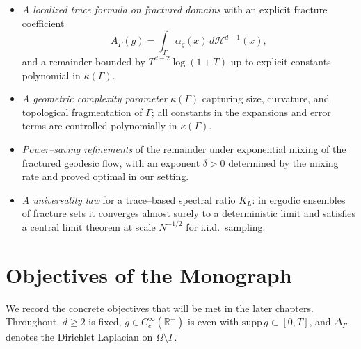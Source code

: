 \begin{itemize}
  \item \emph{A localized trace formula on fractured domains} with an explicit 
  fracture coefficient 
  \[
  A_\Gamma(g)=\int_\Gamma \alpha_g(x)\,d\mathcal H^{d-1}(x),
  \]
  and a remainder bounded by $T^{d-2}\log(1+T)$ up to explicit constants 
  polynomial in $\kappa(\Gamma)$.

  \item \emph{A geometric complexity parameter} $\kappa(\Gamma)$ capturing size, 
  curvature, and topological fragmentation of $\Gamma$; all constants in the 
  expansions and error terms are controlled polynomially in $\kappa(\Gamma)$.

  \item \emph{Power–saving refinements} of the remainder under exponential 
  mixing of the fractured geodesic flow, with an exponent $\delta>0$ determined 
  by the mixing rate and proved optimal in our setting.

  \item \emph{A universality law} for a trace–based spectral ratio $K_L$: in 
  ergodic ensembles of fracture sets it converges almost surely to a 
  deterministic limit and satisfies a central limit theorem at scale $N^{-1/2}$ 
  for i.i.d.\ sampling.
\end{itemize}

\section{Objectives of the Monograph}

We record the concrete objectives that will be met in the later chapters. 
Throughout, $d\ge2$ is fixed, $g\in C_c^\infty(\mathbb R^+)$ is even with 
$\mathrm{supp}\,g\subset[0,T]$, and $\Delta_\Gamma$ denotes the Dirichlet 
Laplacian on $\Omega\setminus\Gamma$.

